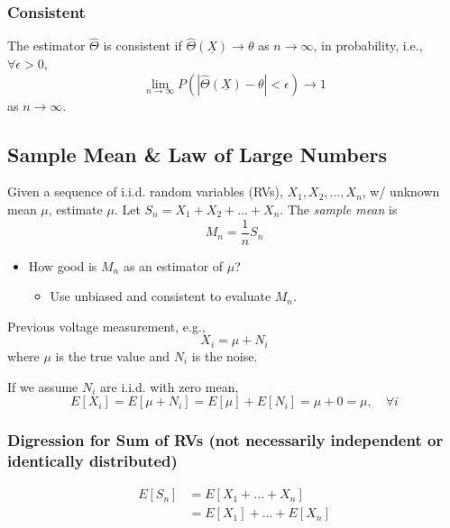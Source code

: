 \subsubsection{Consistent}
\begin{definition}
    The estimator $\hat{\Theta}$ is consistent if $\hat{\Theta}(\underline{X}) \rightarrow \theta$ as $n \to \infty$, in probability, i.e., $\forall \epsilon > 0$,
    \begin{equation}
        \lim_{n \to \infty} P(|\hat{\Theta}(\underline{X}) - \theta| < \epsilon) \rightarrow 1
    \end{equation}
    as $n \to \infty$.
\end{definition}

\subsection{Sample Mean \& Law of Large Numbers}
\begin{definition}
    Given a sequence of i.i.d. random variables (RVs), $X_1, X_2, \dots, X_n$, w/ unknown mean $\mu$, estimate $\mu$. Let $S_n = X_1 + X_2 + \dots + X_n$.  
    The \textit{sample mean} is  
    \[
    M_n = \frac{1}{n} S_n
    \]
    
    \begin{itemize}
        \item How good is $M_n$ as an estimator of $\mu$?
        \begin{itemize}
            \item Use unbiased and consistent to evaluate $M_n$.
        \end{itemize}
    \end{itemize}
\end{definition}

\begin{example}
    Previous voltage measurement, e.g.,  
    \[
    X_i = \mu + N_i
    \]
    where $\mu$ is the true value and $N_i$ is the noise.
    \vspace{1em}

    If we assume $N_i$ are i.i.d. with zero mean,  
    \[
    E[X_i] = E[\mu + N_i] = E[\mu] + E[N_i] = \mu + 0 = \mu, \quad \forall i
    \]
\end{example}

\subsubsection{Digression for Sum of RVs (not necessarily independent or identically distributed)}
\begin{derivation} 
    \begin{align*}
        E[S_n] &= E[X_1 + \dots + X_n] \\
        &= E[X_1] + \dots + E[X_n]
    \end{align*}
\end{derivation}

